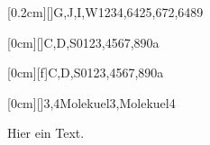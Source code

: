\documentclass[./main.tex]{subfiles}
\begin{document}


\kastenarray[2.5cm]{3cm}[0.2cm][]{G,J,I,W}{1234,6425,672,6489}

\kastenarray[3cm]{4cm}[0cm][]{C,D,S}{0123,4567,890a}

\kastenarray{2cm}[0cm][f]{C,D,S}{0123,4567,890a}



\kastenarray[7cm]{7cm}[0cm][]{3,4}{Molekuel3,Molekuel4}

Hier ein Text.
\newpage
\aufgabenende
\end{document}
